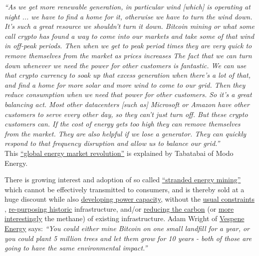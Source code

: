 \textit{``As we get more renewable generation, in particular wind [which] is operating at night ...  we have to find a home for it, otherwise we have to turn the wind down. It’s such a great resource we shouldn’t turn it down. Bitcoin mining or what some call crypto has found a way to come into our markets and take some of that wind in off-peak periods. Then when we get to peak period times they are very quick to remove themselves from the market as prices increases The fact that we can turn down whenever we need the power for other customers is fantastic. We can use that crypto currency to soak up that excess generation when there’s a lot of that, and find a home for more solar and more wind to come to our grid. Then they reduce consumption when we need that power for other customers. So it’s a great balancing act. Most other datacenters [such as] Microsoft or Amazon have other customers to serve every other day, so they can’t just turn off. But these crypto customers can. If the cost of energy gets too high they can remove themselves from the market. They are also helpful if we lose a generator. They can quickly respond to that frequency disruption and allow us to balance our grid.''}\\
This \href{https://www.citadel21.com/bitcoin-is-the-first-global-market-for-electricity-and-will-unleash-renewables}{``global energy market revolution''} is explained by Tabatabai of Modo Energy.\par 
There is growing interest and adoption of so called \href{https://www.bloomberg.com/news/articles/2022-06-01/oman-backs-u-s-firm-mining-crypto-to-cut-natural-gas-flaring}{``stranded energy mining''}  which cannot be effectively transmitted to consumers, and is thereby sold at a huge discount while also \href{https://www.renewableenergyworld.com/wind-power/900mw-wind-farm-to-power-bitcoin-mining-operation/}{developing power capacity}, without the \href{https://batcoinz.com/the-renewable-energy-cannot-happen-without-bitcoin-mining\%ef\%bf\%bc/}{usual constraints} \cite{bastian2021hedging}, \href{https://www.curbed.com/2021/07/crypto-currency-mining-old-power-plants.html}{re-purposing historic} infrastructure, and/or \href{https://www.bloomberg.com/news/articles/2022-03-24/exxon-considers-taking-gas-to-bitcoin-pilot-to-four-countries}{reducing the carbon} (or \href{https://batcoinz.com/quantifying-the-potential-impact-of-bitcoin-mining-on-global-methane-emissions-4/}{more interestingly} the methane) of existing infrastructure. Adam Wright of \href{https://vespene.energy/}{Vespene Energy} says: \textit{``You could either mine Bitcoin on one small landfill for a year, or you could plant 5 million trees and let them grow for 10 years - both of those are going to have the same environmental impact.''}\par
